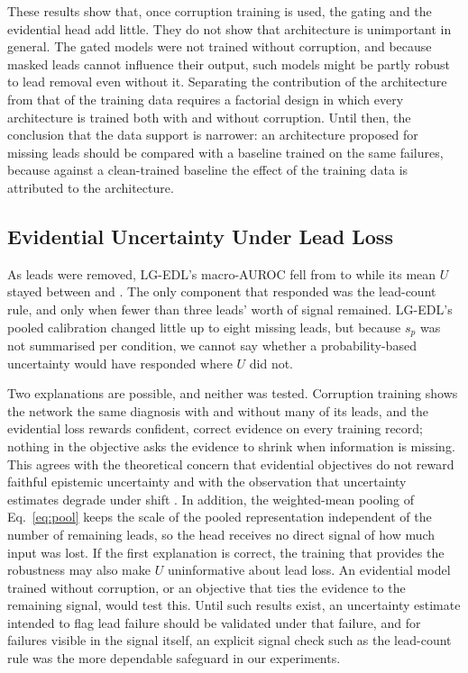 These results show that, once corruption training is used, the gating and the evidential head add little. They do
not show that architecture is unimportant in general. The gated models were not trained without corruption, and
because masked leads cannot influence their output, such models might be partly robust to lead removal even
without it. Separating the contribution of the architecture from that of the training data requires a factorial
design in which every architecture is trained both with and without corruption. Until then, the conclusion that
the data support is narrower: an architecture proposed for missing leads should be compared with a baseline trained
on the same failures, because against a clean-trained baseline the effect of the training data is attributed to the
architecture.

\subsection{Evidential Uncertainty Under Lead Loss}
As leads were removed, LG-EDL's macro-AUROC fell from \aucLgEdlKZero{} to \aucLgEdlKTen{} while its mean $U$ stayed
between \meanUKTen{} and \meanUKZero. The only component that responded was the lead-count rule, and only when fewer
than three leads' worth of signal remained. LG-EDL's pooled calibration changed little up to eight missing leads,
but because $s_p$ was not summarised per condition, we cannot say whether a probability-based uncertainty would have
responded where $U$ did not.

Two explanations are possible, and neither was tested. Corruption training shows the network the same diagnosis with
and without many of its leads, and the evidential loss rewards confident, correct evidence on every training
record; nothing in the objective asks the evidence to shrink when information is missing. This agrees with the
theoretical concern that evidential objectives do not reward faithful epistemic uncertainty
\cite{bengs2022pitfalls,shen2024mirage} and with the observation that uncertainty estimates degrade under shift
\cite{ovadia2019trust}. In addition, the weighted-mean pooling of Eq.~\eqref{eq:pool} keeps the scale of the pooled
representation independent of the number of remaining leads, so the head receives no direct signal of how much input
was lost. If the first explanation is correct, the training that provides the robustness may also make $U$
uninformative about lead loss. An evidential model trained without corruption, or an objective that ties the
evidence to the remaining signal, would test this. Until such results exist, an uncertainty estimate intended to
flag lead failure should be validated under that failure, and for failures visible in the signal itself, an explicit
signal check such as the lead-count rule was the more dependable safeguard in our experiments.
